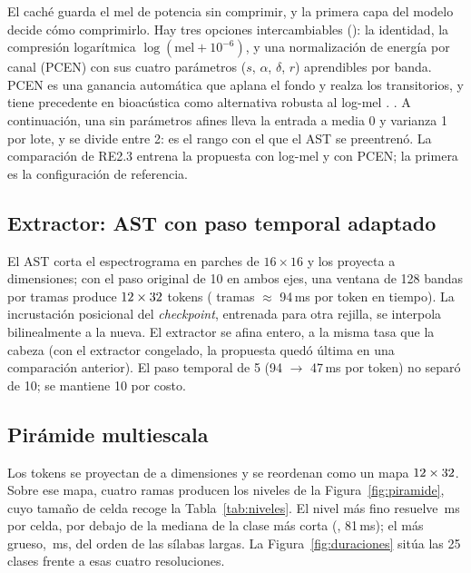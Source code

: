 \documentclass[12pt,a4paper]{article}
\begin{document}
El caché guarda el mel de potencia sin comprimir, y la primera capa del modelo decide cómo
comprimirlo. Hay tres opciones intercambiables (): la
identidad, la compresión logarítmica $\log(\text{mel} + 10^{-6})$, y una normalización de
energía por canal (PCEN) con sus cuatro parámetros ($s$, $\alpha$, $\delta$, $r$) aprendibles
por banda. PCEN es una ganancia automática que aplana el fondo y realza los transitorios, y
tiene precedente en bioacústica como alternativa robusta al log-mel
\citep{lostanlen_robust_2019}. . A continuación,
una  sin parámetros afines lleva la entrada a media 0 y varianza 1 por lote,
y se divide entre 2: es el rango con el que el AST se preentrenó. La comparación de RE2.3
entrena la propuesta con log-mel y con PCEN; la primera es la configuración de referencia.

\subsection{Extractor: AST con paso temporal adaptado}

El AST corta el espectrograma en parches de $16 \times 16$ y los proyecta a \hidden{}
dimensiones; con el paso original de 10 en ambos ejes, una ventana de 128 bandas por
\nFrames{} tramas produce $12 \times 32$ tokens (\timeStride{} tramas
$\approx$ 94\,ms por token en tiempo). La incrustación posicional del \emph{checkpoint},
entrenada para otra rejilla, se interpola bilinealmente a la nueva. El extractor se afina
entero, a la misma tasa que la cabeza (con el extractor congelado, la propuesta quedó última
en una comparación anterior). El paso temporal de 5 (94 $\to$ 47\,ms por token) no separó
de 10; se mantiene 10 por costo.

\subsection{Pirámide multiescala}

Los tokens se proyectan de \hidden{} a \headDim{} dimensiones y se reordenan como un mapa
$12 \times 32$. Sobre ese mapa, cuatro ramas producen los \nLevels{} niveles
de la Figura~\ref{fig:piramide}, cuyo tamaño de celda recoge la Tabla~\ref{tab:niveles}. El
nivel más fino resuelve \cellZero{}\,ms por celda, por debajo de la mediana de la clase más
corta (, 81\,ms); el más grueso, \cellThree{}\,ms, del orden de las sílabas
largas. La Figura~\ref{fig:duraciones} sitúa las 25 clases frente a esas cuatro
resoluciones.
\end{document}
